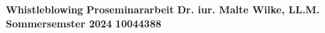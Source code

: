 
\noindent
\begin{center}
    \vspace*{9cm}
    \textbf{Whistleblowing}
    \bigbreak
    \bigbreak
    \bigbreak
    \textbf{Proseminararbeit}
    \bigbreak
    \bigbreak
    \textbf{Dr. iur. Malte Wilke, LL.M.}
    \bigbreak
    \bigbreak
    \textbf{Sommersemster 2024}
    \bigbreak
    \bigbreak
    \textbf{10044388}
\end{center}
